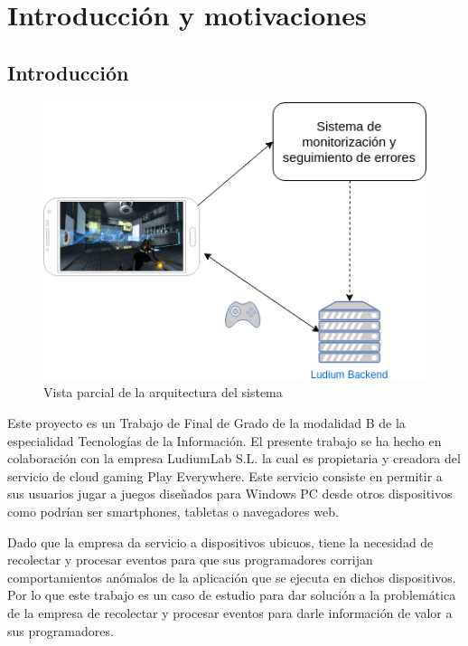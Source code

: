 \chapter{Introducción y motivaciones}

\section{Introducción}

\begin{figure}[!htb]
	\includegraphics[width=\linewidth] {Moduloss-Intro.png}
	\caption{Vista parcial de la arquitectura del sistema}
	\label{fig:intro}
\end{figure}

Este proyecto es un Trabajo de Final de Grado de la modalidad B de la especialidad Tecnologías de la Información. El presente trabajo se ha hecho en colaboración con la empresa LudiumLab S.L. la cual es propietaria y creadora del servicio de cloud gaming Play Everywhere. Este servicio consiste en permitir a sus usuarios jugar a juegos diseñados para Windows PC desde otros dispositivos como podrían ser smartphones, tabletas o navegadores web. 

Dado que la empresa da servicio a dispositivos ubicuos, tiene la necesidad de recolectar y procesar eventos para que sus programadores corrijan comportamientos anómalos de la aplicación que se ejecuta en dichos dispositivos. Por lo que este trabajo es un caso de estudio para dar solución a la problemática de la empresa de recolectar y procesar eventos para darle información de valor a sus programadores.

